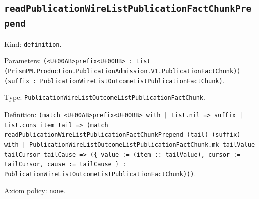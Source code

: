 \documentclass[11pt]{article}
\begin{document}
\subsection*{\texttt{readPublicationWireListPublicationFactChunkPrepend}}
\noindent Kind: \texttt{definition}.\par
\noindent Parameters: \texttt{(<U+00AB>prefix<U+00BB> : List (PrismPM.Production.PublicationAdmission.V1.PublicationFactChunk)) (suffix : PublicationWireListOutcomeListPublicationFactChunk)}.\par
\noindent Type: \texttt{PublicationWireListOutcomeListPublicationFactChunk}.\par
\noindent Definition: \texttt{(match <U+00AB>prefix<U+00BB> with | List.nil => suffix | List.cons item tail => (match readPublicationWireListPublicationFactChunkPrepend (tail) (suffix) with | PublicationWireListOutcomeListPublicationFactChunk.mk tailValue tailCursor tailCause => (\{ value := (item :: tailValue), cursor := tailCursor, cause := tailCause \} : PublicationWireListOutcomeListPublicationFactChunk)))}.\par
\noindent Axiom policy: \texttt{none}.\par
\end{document}
